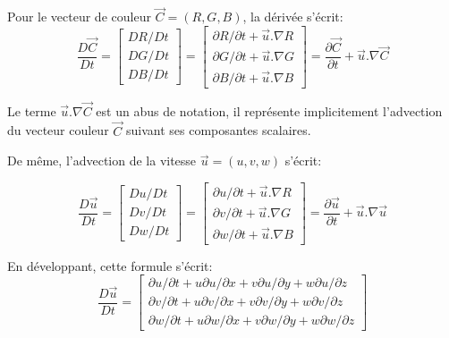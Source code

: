 \documentclass[11pt]{report}
\begin{document}
Pour le vecteur de couleur $ \overrightarrow{C} = (R, G, B) $, la dérivée s'écrit:
\[
\frac{D\overrightarrow{C}}{Dt} = 
  \left[
	\begin{array}{c}
		DR/Dt\\
		DG/Dt\\
		DB/Dt
	\end{array}
 \right] = 
 \left[
	\begin{array}{c}
		\partial R/\partial t + \overrightarrow{u} . \nabla R \\
		\partial G/\partial t + \overrightarrow{u} . \nabla G \\
		\partial B/\partial t + \overrightarrow{u} . \nabla B
	\end{array}
 \right] = 
 \frac{\partial \overrightarrow{C}}{\partial t} + \overrightarrow{u} . \nabla \overrightarrow{C}
\]

Le terme $ \overrightarrow{u} . \nabla \overrightarrow{C} $ est un abus de notation, il représente implicitement l'advection du vecteur couleur $\overrightarrow{C} $ suivant ses composantes scalaires.

De même, l'advection de la vitesse $ \overrightarrow{u} = (u, v, w) $ s'écrit:

\[
\frac{D\overrightarrow{u}}{Dt} = 
  \left[
	\begin{array}{c}
		Du/Dt\\
		Dv/Dt\\
		Dw/Dt
	\end{array}
 \right] = 
 \left[
	\begin{array}{c}
		\partial u/\partial t + \overrightarrow{u} . \nabla R \\
		\partial v/\partial t + \overrightarrow{u} . \nabla G \\
		\partial w/\partial t + \overrightarrow{u} . \nabla B
	\end{array}
 \right] = 
 \frac{\partial \overrightarrow{u}}{\partial t} + \overrightarrow{u} . \nabla \overrightarrow{u}
\]

En développant, cette formule s'écrit:
\[
\frac{D\overrightarrow{u}}{Dt} = 
  \left[
	\begin{array}{c}
		\partial u/\partial t + u \partial u / \partial x + v \partial u / \partial y + w \partial u / \partial z \\
		\partial v/\partial t + u \partial v / \partial x + v \partial v / \partial y + w \partial v / \partial z\\
		\partial w/\partial t + u \partial w / \partial x + v \partial w / \partial y + w \partial w / \partial z
	\end{array}
 \right]
\]
\end{document}
